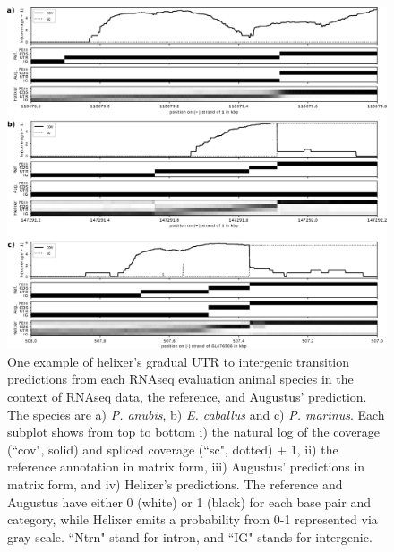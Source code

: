 \documentclass{article}
\renewcommand{\thefigure}{S\arabic{figure}}
\begin{document}
\begin{figure}[!h]
\label{supfig:UTRs_animals}
\centerline{\includegraphics[width=\textwidth]{images/cov_examples/cov_example_UTRs_animals}}
\caption{
One example of helixer's gradual UTR to intergenic transition predictions 
from each RNAseq evaluation animal species in the context of RNAseq data, the reference,
and Augustus' prediction. The species are
a) {\it P. anubis}, b) {\it E. caballus} and c) {\it P. marinus}. Each subplot shows from top to
bottom i) the natural log of the coverage (``cov", solid) and spliced coverage
(``sc", dotted) + 1, ii) the reference annotation in matrix form, iii)
Augustus' predictions in matrix form, and iv) Helixer's predictions. The reference
and Augustus have either 0 (white) or 1 (black) for each base pair and category, while
Helixer emits a probability from 0-1 represented via gray-scale. ``Ntrn" stand
for intron, and ``IG" stands for intergenic.
}
\end{figure}
\end{document}
